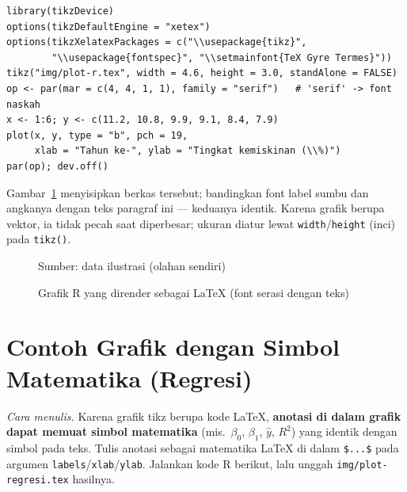 \begin{lstlisting}
library(tikzDevice)
options(tikzDefaultEngine = "xetex")
options(tikzXelatexPackages = c("\\usepackage{tikz}",
        "\\usepackage{fontspec}", "\\setmainfont{TeX Gyre Termes}"))
tikz("img/plot-r.tex", width = 4.6, height = 3.0, standAlone = FALSE)
op <- par(mar = c(4, 4, 1, 1), family = "serif")   # 'serif' -> font naskah
x <- 1:6; y <- c(11.2, 10.8, 9.9, 9.1, 8.4, 7.9)
plot(x, y, type = "b", pch = 19,
     xlab = "Tahun ke-", ylab = "Tingkat kemiskinan (\\%)")
par(op); dev.off()
\end{lstlisting}

Gambar~\ref{gbr:rtikz} menyisipkan berkas tersebut; bandingkan font label sumbu dan
angkanya dengan teks paragraf ini --- keduanya identik. Karena grafik berupa vektor, ia
tidak pecah saat diperbesar; ukuran diatur lewat \texttt{width}/\texttt{height} (inci)
pada \texttt{tikz()}.

\begin{figure}[H]
\centering
\sbox\skripsiblokbox{}%
\usebox\skripsiblokbox\par
\addvspace{0.4\spasi}
\parbox[t]{\wd\skripsiblokbox}{\raggedright\setlength{\parindent}{0pt}\small Sumber: data ilustrasi (olahan sendiri)}\par
\caption{Grafik R yang dirender sebagai LaTeX (font serasi dengan teks)}
\label{gbr:rtikz}
\end{figure}

\section{Contoh Grafik dengan Simbol Matematika (Regresi)}
\emph{Cara menulis.} Karena grafik tikz berupa kode LaTeX, \textbf{anotasi di dalam
grafik dapat memuat simbol matematika} (mis.\ $\beta_0$, $\beta_1$, $\hat{y}$, $R^2$)
yang identik dengan simbol pada teks. Tulis anotasi sebagai matematika LaTeX di dalam
\texttt{\$...\$} pada argumen \texttt{labels}/\texttt{xlab}/\texttt{ylab}. Jalankan kode
R berikut, lalu unggah \texttt{img/plot-regresi.tex} hasilnya.

